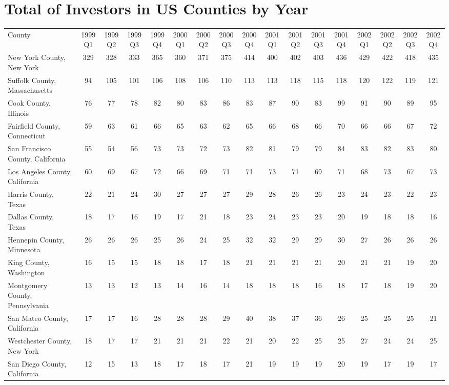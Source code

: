 \chapter{Total of Investors in US Counties by Year}
\label{App:CountiesCount}
   \begin{landscape}
   	  	\tiny 
	\begin{longtable}{lcccccccccccccccc}
		\setlength{\tabcolsep}{8pt}
County &1999Q1 &1999Q2 &1999Q3 &1999Q4 &2000Q1 &2000Q2 &2000Q3 &2000Q4 &2001Q1 & 2001Q2 &2001Q3 &2001Q4 &2002Q1 &2002Q2 &2002Q3 & 2002Q4 \\
	New York County, New York & 329 & 328 & 333 & 365 & 360 & 371 & 375 & 414 & 400 & 402 & 403 & 436 & 429 & 422 & 418 & 435 \\
	Suffolk County, Massachusetts & 94 & 105 & 101 & 106 & 108 & 106 & 110 & 113 & 113 & 118 & 115 & 118 & 120 & 122 & 119 & 121 \\
	Cook County, Illinois & 76 & 77 & 78 & 82 & 80 & 83 & 86 & 83 & 87 & 90 & 83 & 99 & 91 & 90 & 89 & 95 \\
	Fairfield County, Connecticut & 59 & 63 & 61 & 66 & 65 & 63 & 62 & 65 & 66 & 68 & 66 & 70 & 66 & 66 & 67 & 72 \\
	San Francisco County, California & 55 & 54 & 56 & 73 & 73 & 72 & 73 & 82 & 81 & 79 & 79 & 84 & 83 & 82 & 83 & 80 \\
	Los Angeles County, California & 60 & 69 & 67 & 72 & 66 & 69 & 71 & 71 & 73 & 71 & 69 & 71 & 68 & 73 & 67 & 73 \\
	Harris County, Texas & 22 & 21 & 24 & 30 & 27 & 27 & 27 & 29 & 28 & 26 & 26 & 23 & 24 & 23 & 22 & 23 \\
	Dallas County, Texas & 18 & 17 & 16 & 19 & 17 & 21 & 18 & 23 & 24 & 23 & 23 & 20 & 19 & 18 & 18 & 16 \\
	Hennepin County, Minnesota & 26 & 26 & 26 & 25 & 26 & 24 & 25 & 32 & 32 & 29 & 29 & 30 & 27 & 26 & 26 & 26 \\
	King County, Washington & 16 & 15 & 15 & 18 & 18 & 17 & 18 & 21 & 21 & 21 & 21 & 20 & 21 & 21 & 19 & 20 \\
	Montgomery County, Pennsylvania & 13 & 13 & 12 & 13 & 14 & 16 & 14 & 18 & 18 & 18 & 16 & 18 & 17 & 18 & 19 & 20 \\
	San Mateo County, California & 17 & 17 & 16 & 28 & 28 & 28 & 29 & 40 & 38 & 37 & 36 & 26 & 25 & 25 & 25 & 21 \\
	Westchester County, New York & 18 & 17 & 17 & 21 & 21 & 21 & 22 & 21 & 20 & 22 & 25 & 25 & 27 & 24 & 24 & 25 \\
	San Diego County, California & 12 & 15 & 13 & 18 & 17 & 18 & 17 & 21 & 19 & 19 & 19 & 20 & 19 & 17 & 19 & 17 \\

\end{longtable}
\end{landscape}
